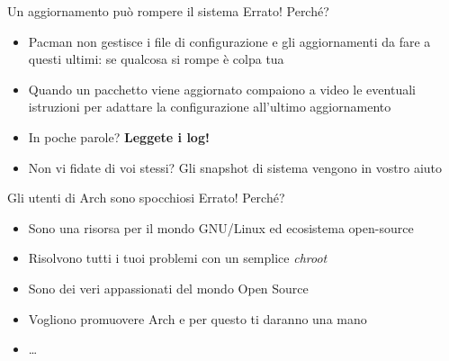 
\begin{frame}{Un aggiornamento può rompere il sistema}
    \alert{Errato!} Perché?
    \begin{itemize}
        \item Pacman non gestisce i file di configurazione e gli aggiornamenti da fare a questi ultimi: se qualcosa si rompe è colpa tua
        \item Quando un pacchetto viene aggiornato compaiono a video le eventuali istruzioni per adattare la configurazione all'ultimo aggiornamento 
        \item In poche parole? \textbf{Leggete i log!}
        \item Non vi fidate di voi stessi? Gli snapshot di sistema vengono in vostro aiuto
    \end{itemize}
\end{frame}


\begin{frame}{Gli utenti di Arch sono spocchiosi}
    \alert{Errato!} Perché?
    \begin{itemize}
        \item Sono una risorsa per il mondo GNU/Linux ed ecosistema open-source
        \item Risolvono tutti i tuoi problemi con un semplice \textit{chroot}
        \item Sono dei veri appassionati del mondo Open Source
        \item Vogliono promuovere Arch e per questo ti daranno una mano
        \item \dots
    \end{itemize}
\end{frame}



